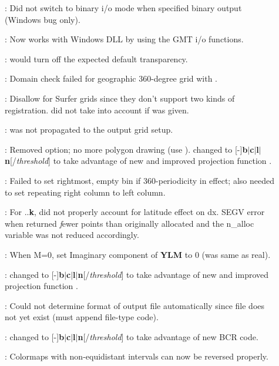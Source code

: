 \begin{description}
\item []: Did not switch to binary i/o mode when
 specified binary output (Windows bug only).
\item []: Now works with Windows DLL by using the GMT i/o functions.
\item []:  would turn off the expected default transparency.
\item []: Domain check failed for geographic 360-degree grid with .
\item []: Disallow  for Surfer grids since they don't support two
kinds of registration.  did not take into account if  was given.
\item []:  was not propagated to the output grid setup.
\item []: Removed  option; no more polygon drawing (use ).
 changed to [-]{\bf b$|$c$|$l$|$n}[/{\it threshold}] to
take advantage of new and improved projection function .
\item []: Failed to set rightmost, empty bin if 360-periodicity in effect;
also needed to set repeating right column to left column.
\item []: For ..{\bf k}, did not properly account for latitude effect on dx.
SEGV error when  returned {\emph fewer} points
than originally allocated and the n\_alloc variable was not reduced accordingly.
\item []: When M=0, set Imaginary component of {\bf YLM} to 0 (was same as real).
\item []:  changed to [-]{\bf b$|$c$|$l$|$n}[/{\it threshold}] to
take advantage of new and improved projection function .
\item []: Could not determine format of output file automatically since file
does not yet exist (must append file-type code).
\item []:  changed to [-]{\bf b$|$c$|$l$|$n}[/{\it threshold}] to
take advantage of new BCR code.
\item []: Colormaps with non-equidistant intervals can now be reversed properly.

\end{description}
